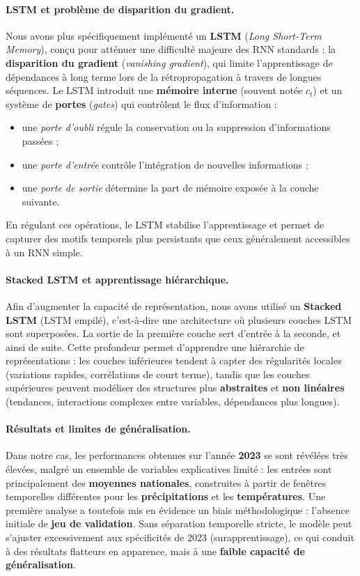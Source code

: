 \documentclass{article}
\theoremstyle{nopointbreak}
\theoremstyle{nobrkbold}
\begin{document}
\paragraph{LSTM et problème de disparition du gradient.}
Nous avons plus spécifiquement implémenté un \textbf{LSTM} (\emph{Long Short-Term Memory}), conçu pour atténuer une difficulté majeure des RNN standards : la \textbf{disparition du gradient} (\emph{vanishing gradient}), qui limite l'apprentissage de dépendances à long terme lors de la rétropropagation à travers de longues séquences. Le LSTM introduit une \textbf{mémoire interne} (souvent notée $c_t$) et un système de \textbf{portes} (\emph{gates}) qui contrôlent le flux d'information :
\begin{itemize}
    \item une \emph{porte d'oubli} régule la conservation ou la suppression d'informations passées ;
    \item une \emph{porte d'entrée} contrôle l'intégration de nouvelles informations ;
    \item une \emph{porte de sortie} détermine la part de mémoire exposée à la couche suivante.
\end{itemize}
En régulant ces opérations, le LSTM stabilise l'apprentissage et permet de capturer des motifs temporels plus persistants que ceux généralement accessibles à un RNN simple.

\paragraph{Stacked LSTM et apprentissage hiérarchique.}
Afin d'augmenter la capacité de représentation, nous avons utilisé un \textbf{Stacked LSTM} (LSTM empilé), c'est-à-dire une architecture où plusieurs couches LSTM sont superposées. La sortie de la première couche sert d'entrée à la seconde, et ainsi de suite. Cette profondeur permet d'apprendre une hiérarchie de représentations : les couches inférieures tendent à capter des régularités locales (variations rapides, corrélations de court terme), tandis que les couches supérieures peuvent modéliser des structures plus \textbf{abstraites} et \textbf{non linéaires} (tendances, interactions complexes entre variables, dépendances plus longues).

\paragraph{Résultats et limites de généralisation.}
Dans notre cas, les performances obtenues sur l'année \textbf{2023} se sont révélées très élevées, malgré un ensemble de variables explicatives limité : les entrées sont principalement des \textbf{moyennes nationales}, construites à partir de fenêtres temporelles différentes pour les \textbf{précipitations} et les \textbf{températures}. Une première analyse a toutefois mis en évidence un biais méthodologique : l'absence initiale de \textbf{jeu de validation}. Sans séparation temporelle stricte, le modèle peut s'ajuster excessivement aux spécificités de 2023 (surapprentissage), ce qui conduit à des résultats flatteurs en apparence, mais à une \textbf{faible capacité de généralisation}.
\end{document}
